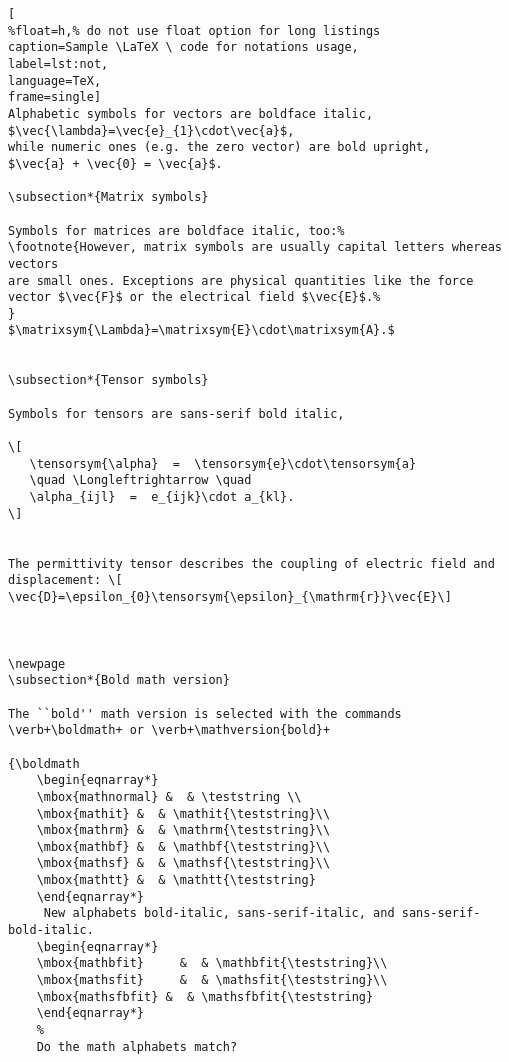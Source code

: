 \begin{lstlisting}[
%float=h,% do not use float option for long listings
caption=Sample \LaTeX \ code for notations usage, 
label=lst:not,
language=TeX,
frame=single]
Alphabetic symbols for vectors are boldface italic,
$\vec{\lambda}=\vec{e}_{1}\cdot\vec{a}$,
while numeric ones (e.g. the zero vector) are bold upright,
$\vec{a} + \vec{0} = \vec{a}$.

\subsection*{Matrix symbols}

Symbols for matrices are boldface italic, too:%
\footnote{However, matrix symbols are usually capital letters whereas vectors
are small ones. Exceptions are physical quantities like the force
vector $\vec{F}$ or the electrical field $\vec{E}$.%
}
$\matrixsym{\Lambda}=\matrixsym{E}\cdot\matrixsym{A}.$


\subsection*{Tensor symbols}

Symbols for tensors are sans-serif bold italic,

\[
   \tensorsym{\alpha}  =  \tensorsym{e}\cdot\tensorsym{a}
   \quad \Longleftrightarrow \quad
   \alpha_{ijl}  =  e_{ijk}\cdot a_{kl}.
\]


The permittivity tensor describes the coupling of electric field and
displacement: \[
\vec{D}=\epsilon_{0}\tensorsym{\epsilon}_{\mathrm{r}}\vec{E}\]



\newpage
\subsection*{Bold math version}

The ``bold'' math version is selected with the commands
\verb+\boldmath+ or \verb+\mathversion{bold}+

{\boldmath
	\begin{eqnarray*}
	\mbox{mathnormal} &  & \teststring \\
	\mbox{mathit} &  & \mathit{\teststring}\\
	\mbox{mathrm} &  & \mathrm{\teststring}\\
	\mbox{mathbf} &  & \mathbf{\teststring}\\
	\mbox{mathsf} &  & \mathsf{\teststring}\\
	\mbox{mathtt} &  & \mathtt{\teststring}
	\end{eqnarray*}
	 New alphabets bold-italic, sans-serif-italic, and sans-serif-bold-italic.
	\begin{eqnarray*}
	\mbox{mathbfit}     &  & \mathbfit{\teststring}\\
	\mbox{mathsfit}     &  & \mathsfit{\teststring}\\
	\mbox{mathsfbfit} &  & \mathsfbfit{\teststring}
	\end{eqnarray*}
	%
	Do the math alphabets match?


\end{lstlisting}

